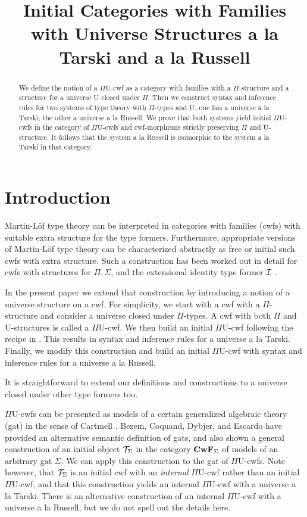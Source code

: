 \documentclass{lmcs}
\title{Initial Categories with Families\\ with Universe Structures 
a la Tarski and a la Russell}
\def\UU{\mathrm{U}}
\begin{document}
\maketitle

\begin{abstract}
We define the notion of a $\Pi\UU$-cwf as a category with families with a $\Pi$-structure and a structure for a universe $\UU$ closed under $\Pi$. Then we construct syntax and inference rules for two systems of type theory with $\Pi$-types and $\UU$, one has a universe a la Tarski, the other a universe a la Russell. We prove that both systems yield initial $\Pi\UU$-cwfs in the category of $\Pi\UU$-cwfs and cwf-morphisms strictly preserving $\Pi$ and $\UU$-structure. It follows that the system a la Russell is isomorphic to the system a la Tarski in that category.
 \end{abstract}

\allowdisplaybreaks
\section{Introduction}

Martin-Löf type theory can be interpreted in categories with families (cwfs) with suitable extra structure for the type formers. Furthermore, appropriate versions of Martin-Löf type theory can be characterized  abstractly as free or initial such cwfs with extra structure. Such a construction has been worked out in detail for cwfs with structures for $\Pi, \Sigma$, and the extensional identity type former ${\mathcal I}$ \cite{castellan:tlca2015}. 

In the present paper we extend that construction by introducing a notion of a universe structure on a cwf. For simplicity, we start with a cwf with a $\Pi$-structure and consider a universe closed under $\Pi$-types. A cwf with both $\Pi$ and $\UU$-structures is called a $\Pi\UU$-cwf. We then build an initial  $\Pi\UU$-cwf  following the recipe in \cite{castellan:tlca2015}. This results in syntax and inference rules for a universe a la Tarski. Finally, we modify this construction and build an initial  $\Pi\UU$-cwf  with syntax and inference rules for a universe a la Russell.

It is straightforward to extend our definitions and constructions to a universe closed under other type formers too.

$\Pi\UU$-cwfs can be presented as models of a certain generalized algebraic theory (gat) in the sense of Cartmell \cite{cartmell:phd}. Bezem, Coquand, Dybjer, and Escardo \cite{bezem:hofmann} have provided an alternative semantic definition of gats, and also shown a general construction of an initial object ${\mathcal T}_\Sigma$ in the category $\textbf{CwF}_\Sigma$ of models of an arbitrary gat $\Sigma$. We can apply this construction to the gat of $\Pi\UU$-cwfs. Note however, that ${\mathcal T}_\Sigma$ is an initial cwf with an {\em internal} $\Pi\UU$-cwf rather than an initial $\Pi\UU$-cwf, and that this construction yields an internal $\Pi\UU$-cwf with a universe a la Tarski. There is an alternative construction of an internal $\Pi\UU$-cwf with a universe a la Russell, but we do not spell out the details here.
\end{document}
